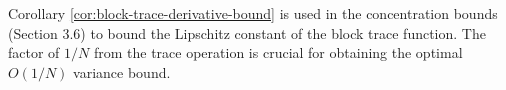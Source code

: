 \begin{remark}
Corollary \ref{cor:block-trace-derivative-bound} is used in the concentration bounds (Section 3.6) to bound the Lipschitz constant of the block trace function. The factor of $1/N$ from the trace operation is crucial for obtaining the optimal $O(1/N)$ variance bound.
\end{remark}
